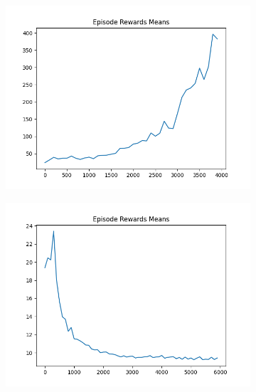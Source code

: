 \begin{figure}[H]
\begin{subfigure}{.47\linewidth}
        \includegraphics[width=\textwidth]{pole/2024-06-14_16-42-26_dqn_cartpole_episode_rewards_means.png}
    \end{subfigure}
    \begin{subfigure}{.47\linewidth}
        \centering
        \includegraphics[width=\textwidth]{pole/2024-06-14_18-54-27_dqn_cartpole_episode_rewards_means.png}
    \end{subfigure}
\end{figure}
